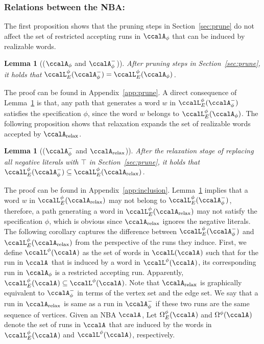 \documentclass[Afour,sageh,times]{sagej}
\newtheorem{lem}[thm]{Lemma}
\newcommand{\auto}[1]{\ccalA_{\textup{#1}}}
\newcommand{\autop}{\ccalA_{\phi}}
\begin{document}
{{\subsubsection{Relations between the NBA:}\label{app:relation}
  The first proposition shows that the pruning steps in Section~\ref{sec:prune} do not affect the set of restricted accepting runs  in $\autop$ that can be induced by realizable words.
 \begin{lem}[($\autop$ and $\autop^-$)]\label{prop:prune}
After pruning steps in Section~\ref{sec:prune}, it holds that  $\ccalL_E^\phi(\autop^-) = \ccalL^\phi_E(\autop)$.
  \end{lem}
    The proof can be found in Appendix~\ref{app:prune}. A direct consequence of Lemma~\ref{prop:prune} is that, any path that generates a word $w$ in  $\ccalL_E^\phi(\autop^-)$ satisfies the specification $\phi$, since the word $w$ belongs to $\ccalL^\phi_E(\autop)$. The following proposition shows that relaxation expands the set of realizable words accepted by $\auto{relax}$.
  \begin{lem}[($\autop^-$ and $\auto{relax}$)]\label{prop:inclusion}
 After the relaxation stage of replacing all negative literals with $\top$ in Section~\ref{sec:prune}, it holds that $\ccalL^\phi_E(\autop^-) \subseteq \ccalL^\phi_E(\auto{relax})$.
  \end{lem}
  The proof can be found in Appendix~\ref{app:inclusion}. Lemma~\ref{prop:inclusion} implies that a word $w$ in $\ccalL^\phi_E(\auto{relax})$ may not belong to $\ccalL^\phi_E(\autop^-)$, therefore, a path generating a word in $\ccalL^\phi_E(\auto{relax})$ may not satisfy the specification $\phi$, which is obvious since $\auto{relax}$ ignores the negative literals. The following corollary captures the difference between $\ccalL^\phi_E(\autop^-) $ and $\ccalL^\phi_E(\auto{relax})$ from the perspective of the runs they induce. First, we define $\ccalL^\phi(\auto{})$ as the set of  words in $\ccalL(\auto{})$ such that for the run in $\auto{}$ that is induced by a word in $\ccalL^\phi(\auto{})$, its corresponding run in $\autop$ is a restricted accepting run. Apparently, $\ccalL_E^\phi(\auto{})  \subseteq \ccalL^\phi(\auto{})$.  Note that   $\auto{relax}$ is graphically equivalent to $\autop^-$ in terms of the vertex set and the edge set. We say that a run in $\auto{relax}$ is same as a run in $\autop^-$ if these two runs are the same sequence of vertices. Given an NBA $\auto{}$, Let $\Omega_E^\phi(\auto{})$ and $\Omega^\phi(\auto{})$ denote the set of runs in $\auto{}$ that are induced by the words in $\ccalL_E^\phi(\auto{})$ and $\ccalL^\phi(\auto{})$, respectively.
}}
\end{document}
